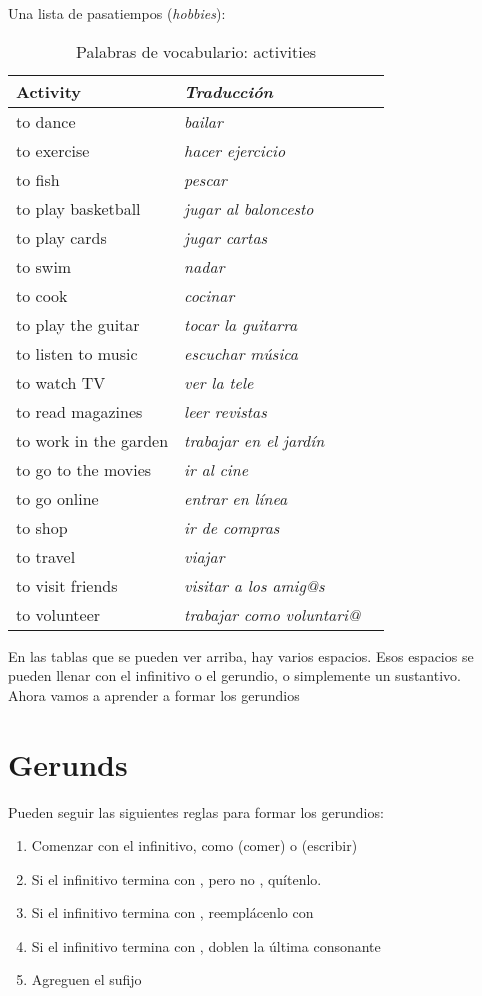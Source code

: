 Una lista de pasatiempos (\emph{hobbies}):
\begin{table}[H]
	\centering
	\begin{tabular}{lll}
	\toprule
		\textbf{Activity} & \textbf{\emph{Traducci\'on}} &\\
	\midrule
		to dance & \emph{bailar} \\
		to exercise & \emph{hacer ejercicio}  \\
		to fish & \emph{pescar} \\
		to play basketball & \emph{jugar al baloncesto} \\
		to play cards & \emph{jugar cartas} \\
		to swim & \emph{nadar} \\
		to cook & \emph{cocinar} \\
		to play the guitar & \emph{tocar la guitarra} \\
		to listen to music & \emph{escuchar música} \\
		to watch TV & \emph{ver la tele} \\
		to read magazines & \emph{leer revistas} \\
		to work in the garden & \emph{trabajar en el jardín} \\
		to go to the movies & \emph{ir al cine} \\
		to go online & \emph{entrar en línea} \\
		to shop & \emph{ir de compras} \\
		to travel & \emph{viajar} \\
		to visit friends & \emph{visitar a los amig@s} \\
		to volunteer & \emph{trabajar como voluntari@} \\
	\bottomrule
	\end{tabular}
	\caption{Palabras de vocabulario: activities}
\end{table}

En las tablas que se pueden ver arriba, hay varios espacios.
Esos espacios se pueden llenar con el infinitivo o el gerundio, o simplemente un sustantivo. \\

Ahora vamos a aprender a formar los gerundios
\section{Gerunds}

Pueden seguir las siguientes reglas para formar los gerundios:
\begin{enumerate}[noitemsep]
	\item Comenzar con el infinitivo, como  (comer) o  (escribir)
	\item Si el infinitivo termina con , pero no , quítenlo.
	\item Si el infinitivo termina con , reemplácenlo con 
	\item Si el infinitivo termina con , doblen la última consonante
	\item Agreguen el sufijo 
\end{enumerate}

